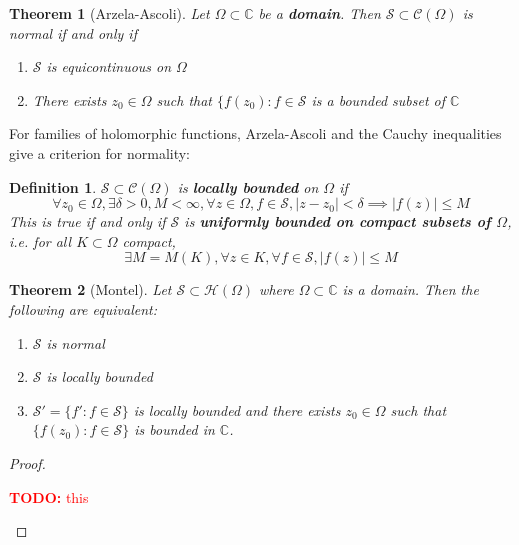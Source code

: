 \documentclass{article}
\newtheorem{theorem}{Theorem}
\newcommand{\mbb}[1]{\mathbb{#1}}
\newcommand{\mc}[1]{\mathcal{#1}}
\newtheorem{definition}{Definition}
\newcommand{\TODO}[1]{\begin{center}\huge{\textcolor{red}{\textbf{TODO:} #1}}\end{center}}
\begin{document}
\begin{theorem}[Arzela-Ascoli]
Let \(\Omega \subset \mbb{C}\) be a \textbf{domain}. Then \(\mc{S} \subset \mc{C}(\Omega)\) is normal if and only if
\begin{enumerate}

  \item \(\mc{S}\) is equicontinuous on \(\Omega\)

  \item There exists \(z_0 \in \Omega\) such that \(\{f(z_0) : f \in \mc{S}\) is a bounded subset of \(\mbb{C}\)

\end{enumerate}
\end{theorem}
For families of holomorphic functions, Arzela-Ascoli and the Cauchy inequalities give a criterion for normality:
\begin{definition}
\(\mc{S} \subset \mc{C}(\Omega)\) is \textbf{locally bounded} on \(\Omega\) if
\begin{equation}\forall z_0 \in \Omega, \exists \delta > 0, M < \infty, \forall z \in \Omega, f \in \mc{S}, |z - z_0| < \delta \implies |f(z)| \leq M\end{equation}
This is true if and only if \(\mc{S}\) is \textbf{uniformly bounded on compact subsets of \(\Omega\)}, i.e. for all \(K \subset \Omega\) compact,
\begin{equation}\exists M = M(K), \forall z \in K, \forall f \in \mc{S}, |f(z)| \leq M\end{equation}
\end{definition}
\begin{theorem}[Montel]
Let \(\mc{S} \subset \mc{H}(\Omega)\) where \(\Omega \subset \mbb{C}\) is a domain. Then the following are equivalent:
\begin{enumerate}

  \item \(\mc{S}\) is normal

  \item \(\mc{S}\) is locally bounded

  \item \(\mc{S}' = \{f' : f \in \mc{S}\}\) is locally bounded and there exists \(z_0 \in\Omega\) such that \(\{f(z_0) : f \in \mc{S}\}\) is bounded in \(\mbb{C}\).

\end{enumerate}
\end{theorem}
\begin{proof}

\TODO{this}

\end{proof}
\end{document}
